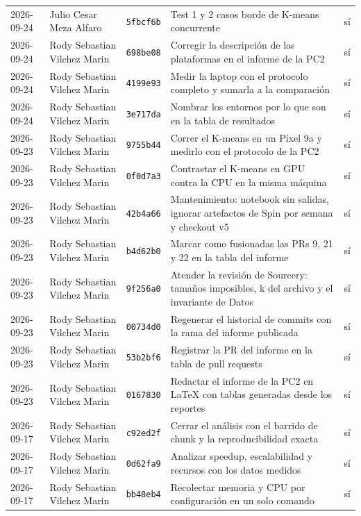 {\begin{xltabular}{\textwidth}{@{}L{1.9cm}L{2.7cm}L{1.4cm}Yc@{}}
2026-09-24 & Julio Cesar Meza Alfaro & \texttt{5fbcf6b} & Test 1 y 2 casos borde de K-means concurrente & sí \\
2026-09-24 & Rody Sebastian Vilchez Marin & \texttt{698be08} & Corregir la descripción de las plataformas en el informe de la PC2 & sí \\
2026-09-24 & Rody Sebastian Vilchez Marin & \texttt{4199e93} & Medir la laptop con el protocolo completo y sumarla a la comparación & sí \\
2026-09-24 & Rody Sebastian Vilchez Marin & \texttt{3e717da} & Nombrar los entornos por lo que son en la tabla de resultados & sí \\
2026-09-23 & Rody Sebastian Vilchez Marin & \texttt{9755b44} & Correr el K-means en un Pixel 9a y medirlo con el protocolo de la PC2 & sí \\
2026-09-23 & Rody Sebastian Vilchez Marin & \texttt{0f0d7a3} & Contrastar el K-means en GPU contra la CPU en la misma máquina & sí \\
2026-09-23 & Rody Sebastian Vilchez Marin & \texttt{42b4a66} & Mantenimiento: notebook sin salidas, ignorar artefactos de Spin por semana y checkout v5 & sí \\
2026-09-23 & Rody Sebastian Vilchez Marin & \texttt{b4d62b0} & Marcar como fusionadas las PRs 9, 21 y 22 en la tabla del informe & sí \\
2026-09-23 & Rody Sebastian Vilchez Marin & \texttt{9f256a0} & Atender la revisión de Sourcery: tamaños imposibles, k del archivo y el invariante de Datos & sí \\
2026-09-23 & Rody Sebastian Vilchez Marin & \texttt{00734d0} & Regenerar el historial de commits con la rama del informe publicada & sí \\
2026-09-23 & Rody Sebastian Vilchez Marin & \texttt{53b2bf6} & Registrar la PR del informe en la tabla de pull requests & sí \\
2026-09-23 & Rody Sebastian Vilchez Marin & \texttt{0167830} & Redactar el informe de la PC2 en LaTeX con tablas generadas desde los reportes & sí \\
2026-09-17 & Rody Sebastian Vilchez Marin & \texttt{c92ed2f} & Cerrar el análisis con el barrido de chunk y la reproducibilidad exacta & sí \\
2026-09-17 & Rody Sebastian Vilchez Marin & \texttt{0d62fa9} & Analizar speedup, escalabilidad y recursos con los datos medidos & sí \\
2026-09-17 & Rody Sebastian Vilchez Marin & \texttt{bb48eb4} & Recolectar memoria y CPU por configuración en un solo comando & sí \\

\end{xltabular}}
